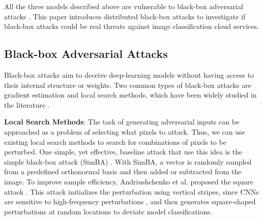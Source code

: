 
All the three models described above are vulnerable to black-box adversarial attacks \cite{szegedy2013intriguing, biggio2013evasion}. This paper introduces distributed black-box attacks to investigate if black-box attacks could be real threats against image classification cloud services.


\subsection{Black-box Adversarial Attacks}
\label{black_box}

Black-box attacks aim to deceive deep-learning models without having access to their internal structure or weights. Two common types of black-box attacks are gradient estimation and local search methods, which have been widely studied in the literature \cite{bhambri2019survey} \cite{wang2022black}.



\textbf{Local Search Methods}: The task of generating adversarial inputs can be approached as a problem of selecting what pixels to attack. Thus, we can use existing local search methods to search for combinations of pixels to be perturbed. One simple, yet effective, baseline attack that use this idea is the simple black-box attack (SimBA) \cite{guo2019simple}. With SimBA, a vector is randomly sampled from a predefined orthonormal basis and then added or subtracted from the image. To improve sample efficiency, Andriushchenko et al. proposed the square attack \cite{andriushchenko2020square}. This attack initializes the perturbation using vertical stripes, since CNNs are sensitive to high-frequency perturbations \cite{yin2019fourier}, and then generates square-shaped perturbations at random locations to deviate model classifications.

